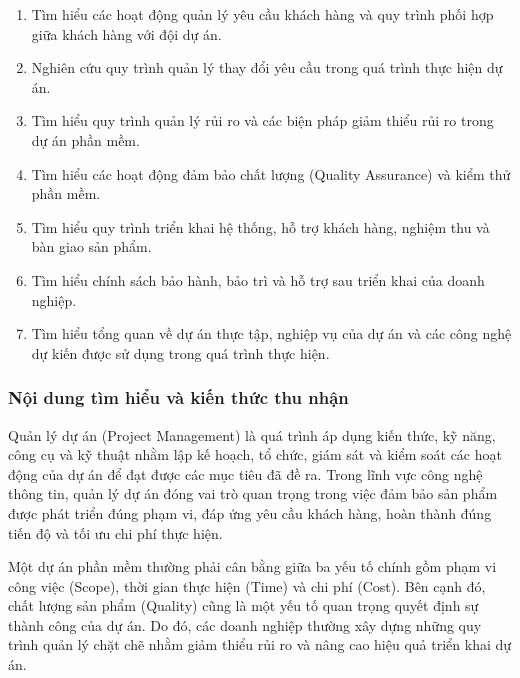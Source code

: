 \begin{enumerate}[label=\textbf{\arabic*.}, leftmargin=1.2cm]
    \item Tìm hiểu các hoạt động quản lý yêu cầu khách hàng và quy trình phối hợp giữa khách hàng với đội dự án.

    \item Nghiên cứu quy trình quản lý thay đổi yêu cầu trong quá trình thực hiện dự án.

    \item Tìm hiểu quy trình quản lý rủi ro và các biện pháp giảm thiểu rủi ro trong dự án phần mềm.

    \item Tìm hiểu các hoạt động đảm bảo chất lượng (Quality Assurance) và kiểm thử phần mềm.

    \item Tìm hiểu quy trình triển khai hệ thống, hỗ trợ khách hàng, nghiệm thu và bàn giao sản phẩm.

    \item Tìm hiểu chính sách bảo hành, bảo trì và hỗ trợ sau triển khai của doanh nghiệp.

    \item Tìm hiểu tổng quan về dự án thực tập, nghiệp vụ của dự án và các công nghệ dự kiến được sử dụng trong quá trình thực hiện.

\end{enumerate}

\subsubsection{Nội dung tìm hiểu và kiến thức thu nhận}


\hspace{0.2cm}Quản lý dự án (Project Management) là quá trình áp dụng kiến thức, kỹ năng, công cụ và kỹ thuật nhằm lập kế hoạch, tổ chức, giám sát và kiểm soát các hoạt động của dự án để đạt được các mục tiêu đã đề ra. Trong lĩnh vực công nghệ thông tin, quản lý dự án đóng vai trò quan trọng trong việc đảm bảo sản phẩm được phát triển đúng phạm vi, đáp ứng yêu cầu khách hàng, hoàn thành đúng tiến độ và tối ưu chi phí thực hiện.

\hspace{0.2cm}Một dự án phần mềm thường phải cân bằng giữa ba yếu tố chính gồm phạm vi công việc (Scope), thời gian thực hiện (Time) và chi phí (Cost). Bên cạnh đó, chất lượng sản phẩm (Quality) cũng là một yếu tố quan trọng quyết định sự thành công của dự án. Do đó, các doanh nghiệp thường xây dựng những quy trình quản lý chặt chẽ nhằm giảm thiểu rủi ro và nâng cao hiệu quả triển khai dự án.

